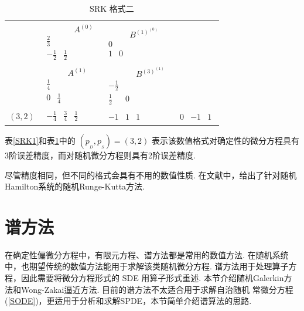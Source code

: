 \begin{table}[!htbp]
	\centering
	\begin{tabular}{p{1cm}<{\centering} | p{2.5cm}<{\centering} | p{2.5cm}<{\centering} |p{2cm}<{\centering}}
		\multirow{2}{*}{}
		\rule{0pt}{30pt} &  
		$\begin{matrix}	&&A^{(0)}\\\frac23 &&\\-\frac12&\frac12& \end{matrix}$& 
		$\begin{matrix} &&B^{(1)^{(0)}} \\ 0&&\\1&0&  \end{matrix}$ & \\
		\cline{2-4}
		\rule{0pt}{30pt} & 
		$\begin{matrix} &&A^{(1)} \\ \frac14&&\\0&\frac14& \end{matrix}$ & 
		$\begin{matrix} &&B^{(3)^{(1)}} \\ -\frac12&&\\\frac12&0&\end{matrix} $ & \\
		\hline
		\rule{0pt}{15pt} $(3,2)$ &  
		$\begin{matrix} -\frac14&\frac34&\frac12 &  \end{matrix}$ & 
		$\begin{matrix} -1&1&1& \end{matrix}$ & 
		$\begin{matrix} 0&-1&1  \end{matrix}$\\
	\end{tabular}
\vspace{.2cm}
\caption{SRK 格式二} \label{SRK2}
\end{table}


表\ref{SRK1}和表\ref{SRK2}中的 $(p_{_D} , p_{_S})=(3,2)$ 表示该数值格式对确定性的微分方程具有3阶误差精度，而对随机微分方程则具有2阶误差精度. 

尽管精度相同，但不同的格式会具有不用的数值性质. 在文献\cite{kutta_6,kutta_7,kutta_8,kutta_9}中，给出了针对随机Hamilton系统的随机Runge-Kutta方法. 

\section{谱方法}
在确定性偏微分方程中，有限元方程、谱方法都是常用的数值方法. 在随机系统中，也期望传统的数值方法能用于求解该类随机微分方程. 谱方法用于处理算子方程，因此需要将微分方程形式的 SDE 用算子形式重述. 本节介绍随机Galerkin方法和Wong-Zakai逼近方法. 目前的谱方法不太适合用于求解自治随机
常微分方程(\ref{SODE})，更适用于分析和求解SPDE，本节简单介绍谱算法的思路. 





